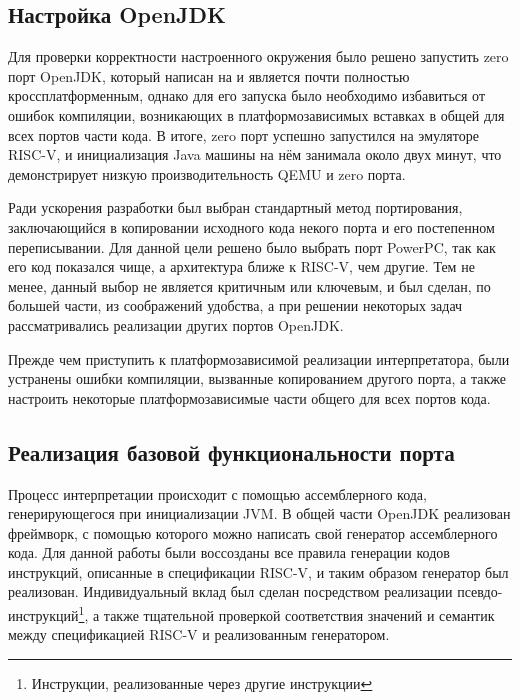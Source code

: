     
\subsection{Настройка OpenJDK}

Для проверки корректности настроенного окружения было решено запустить zero порт OpenJDK, который написан на \cpp и является почти полностью кроссплатформенным, однако для его запуска было необходимо избавиться от ошибок компиляции, возникающих в платформозависимых вставках в общей для всех портов части кода. В итоге, zero порт успешно запустился на эмуляторе RISC-V, и инициализация Java машины на нём занимала около двух минут, что демонстрирует низкую производительность QEMU и zero порта.


Ради ускорения разработки был выбран стандартный метод портирования, заключающийся в копировании исходного кода некого порта и его постепенном переписывании. Для данной цели решено было выбрать порт PowerPC, так как его код показался чище, а архитектура ближе к RISC-V, чем другие. Тем не менее, данный выбор не является критичным или ключевым, и был сделан, по большей части, из соображений удобства, а при решении некоторых задач рассматривались реализации других портов OpenJDK.

Прежде чем приступить к платформозависимой реализации интерпретатора, были устранены ошибки компиляции, вызванные копированием другого порта, а также настроить некоторые платформозависимые части общего для всех портов кода.


\subsection{Реализация базовой функциональности порта}

Процесс интерпретации происходит с помощью ассемблерного кода, генерирующегося при инициализации JVM. В общей части OpenJDK реализован фреймворк, с помощью которого можно написать свой генератор ассемблерного кода. Для данной работы были воссозданы все правила генерации кодов инструкций, описанные в спецификации RISC-V, и таким образом генератор был реализован. Индивидуальный вклад был сделан посредством реализации псевдо-инструкций\footnote{Инструкции, реализованные через другие инструкции}, а также тщательной проверкой соответствия значений и семантик между спецификацией RISC-V и реализованным генератором.

